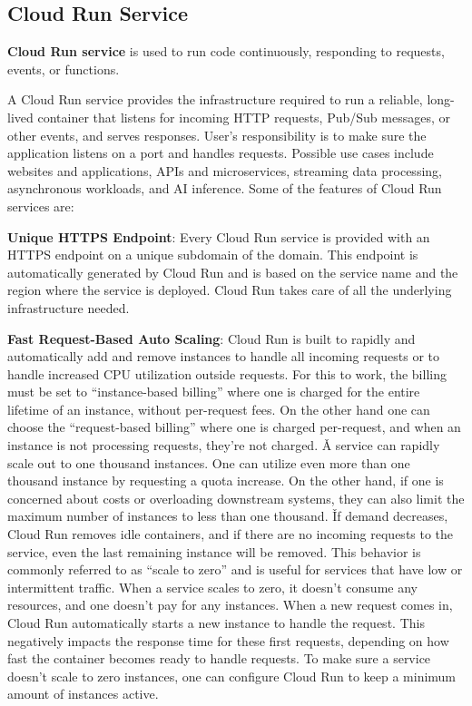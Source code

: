 \subsection{Cloud Run Service}

\textbf{Cloud Run service} is used to run code continuously, responding to requests, events, or functions.
\ed


A Cloud Run service provides the infrastructure required to run a reliable, long-lived container that listens for
incoming HTTP requests, Pub/Sub messages, or other events, and serves responses. User's responsibility is to make
sure the application listens on a port and handles requests. Possible use cases include websites and applications,
APIs and microservices, streaming data processing, asynchronous workloads, and AI inference. Some of the features of
Cloud Run services are:

\bit
\item \textbf{Unique HTTPS Endpoint}: Every Cloud Run service is provided with an HTTPS endpoint on a unique
subdomain of the  domain. This endpoint is automatically generated by Cloud Run and is based on the
service name and the region where the service is deployed. Cloud Run takes care of all the underlying infrastructure
needed.

\item \textbf{Fast Request-Based Auto Scaling}: Cloud Run is built to rapidly and automatically add and remove
instances to handle all incoming requests or to handle increased CPU utilization outside requests. For this to work,
the billing must be set to ``instance-based billing'' where one is charged for the entire lifetime of an instance,
without per-request fees. On the other hand one can choose the ``request-based billing'' where one is charged
per-request, and when an instance is not processing requests, they're not charged. \v

A service can rapidly scale out to one thousand instances. One can utilize even more than one thousand instance by
requesting a quota increase. On the other hand, if one is concerned about costs or overloading downstream systems,
they can also limit the maximum number of instances to less than one thousand. \v

If demand decreases, Cloud Run removes idle containers, and if there are no incoming requests to the service, even
the last remaining instance will be removed. This behavior is commonly referred to as ``scale to zero'' and is
useful for services that have low or intermittent traffic. When a service scales to zero, it doesn't consume any
resources, and one doesn't pay for any instances. When a new request comes in, Cloud Run automatically starts a new
instance to handle the request. This negatively impacts the response time for these first requests, depending on how
fast the container becomes ready to handle requests. To make sure a service doesn't scale to zero instances, one can
configure Cloud Run to keep a minimum amount of instances active.

